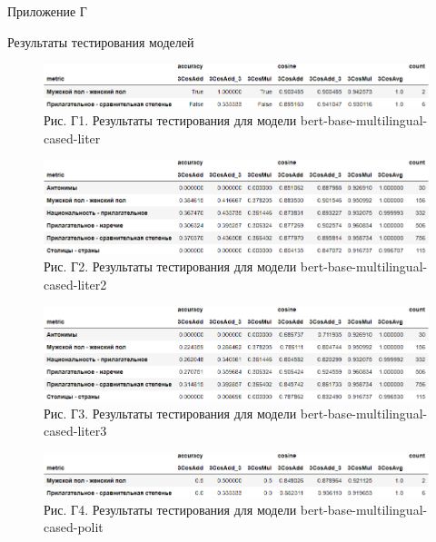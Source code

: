 \documentclass[a4paper,14pt]{article}
\begin{document}
\newpage


\begin{flushright}
	Приложение Г
\end{flushright}

\begin{center}
	 Результаты тестирования моделей
\end{center}

\begin{figure}[H]
	\centering
	\includegraphics[width=0.9\linewidth]{image/res_bert-base-multilingual-cased-liter }
	\caption*{Рис. Г1. Результаты тестирования для модели bert-base-multilingual-cased-liter }
	\label{fig:resbert-base-multilingual-cased-liter }
\end{figure}

\begin{figure}[H]
	\centering
	\includegraphics[width=0.9\linewidth]{image/res_bert-base-multilingual-cased-liter2 }
	\caption*{Рис. Г2. Результаты тестирования для модели bert-base-multilingual-cased-liter2 }
	\label{fig:resbert-base-multilingual-cased-liter2 }
\end{figure}

\begin{figure}[H]
	\centering
	\includegraphics[width=0.9\linewidth]{image/res_bert-base-multilingual-cased-liter3 }
	\caption*{Рис. Г3. Результаты тестирования для модели bert-base-multilingual-cased-liter3 }
	\label{fig:resbert-base-multilingual-cased-liter3 }
\end{figure}

\begin{figure}[H]
	\centering
	\includegraphics[width=0.9\linewidth]{image/res_bert-base-multilingual-cased-polit }
	\caption*{Рис. Г4. Результаты тестирования для модели bert-base-multilingual-cased-polit }
	\label{fig:resbert-base-multilingual-cased-polit }
\end{figure}
\end{document}

